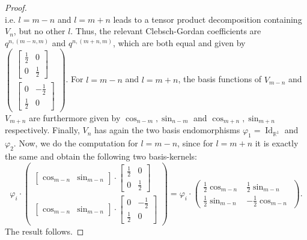 \documentclass[12pt, a4paper]{article}
\theoremstyle{plain}
\theoremstyle{definition}
\theoremstyle{remark}
\newcommand{\R}{\mathds{R}}
\DeclareMathOperator{\Id}{Id}
\begin{document}
\begin{proof}
\begin{equation*}
\end{equation*}
i.e. $l = m-n$ and $l = m+n$ leads to a tensor product decomposition containing $V_n$, but no other $l$. Thus, the relevant Clebsch-Gordan coefficients are $q^{n,(m-n,m)}$ and $q^{n,(m+n,m)}$, which are both equal and given by $\begin{pmatrix} \begin{bmatrix} \frac{1}{2} & 0 \\ 0 & \frac{1}{2} \end{bmatrix} \\ \begin{bmatrix} 0 & - \frac{1}{2} \\ \frac{1}{2} & 0\end{bmatrix}\end{pmatrix}$. For $l = m-n$ and $l = m+n$, the basis functions of $V_{m-n}$ and $V_{m+n}$ are furthermore given by $\cos_{n-m}, \sin_{n-m}$ and $\cos_{m+n}, \sin_{m+n}$ respectively. Finally, $V_n$ has again the two basis endomorphisms $\varphi_1 = \Id_{\R^1}$ and $\varphi_2$. Now, we do the computation for $l = m-n$, since for $l = m+n$ it is exactly the same and obtain the following two basis-kernels:
\begin{equation*}
\varphi_i \cdot \begin{pmatrix} \begin{bmatrix} \cos_{m-n} & \sin_{m-n} \end{bmatrix}\cdot \begin{bmatrix} \frac{1}{2} & 0 \\ 0 & \frac{1}{2}\end{bmatrix} \\
\begin{bmatrix} \cos_{m-n} & \sin_{m-n} \end{bmatrix}\cdot \begin{bmatrix} 0 & - \frac{1}{2} \\ \frac{1}{2} & 0\end{bmatrix} \end{pmatrix} = \varphi_i \cdot \begin{pmatrix} \frac{1}{2} \cos_{m-n} & \frac{1}{2} \sin_{m-n} \\ \frac{1}{2} \sin_{m-n} & - \frac{1}{2} \cos_{m-n}\end{pmatrix}.
\end{equation*} 
The result follows.
\end{proof}
\end{document}
